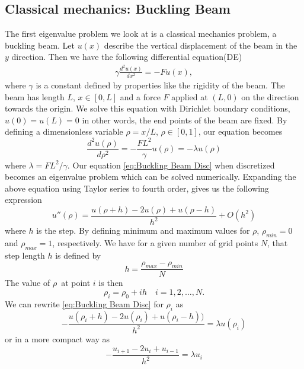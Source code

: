 \documentclass[%
reprint,
nofootinbib,
amsmath,amssymb,
aps,
]{revtex4-1}
\begin{document}
\subsection{Classical mechanics: Buckling Beam} %
The first eigenvalue problem we look at is a classical mechanics problem, a buckling beam. Let $u(x)$ describe the vertical displacement of the beam in the $y$ direction. Then we have the following differential equation(DE) 
\begin{eqnarray}
	\gamma\frac{d^2 u(x)}{dx^2} = -Fu(x),
\end{eqnarray}
where $\gamma$ is a constant defined by properties like the rigidity of the beam. The beam has length $L$, $x\in [0,L]$ and a force $F$ applied at $(L,0)$ on the direction towards the origin. 
We solve this equation with Dirichlet boundary conditions, $u(0) = u(L) = 0$ in other words, the end points of the beam are fixed. 
By defining a dimensionless variable $\rho = x/L$, $\rho \in [0,1]$, our equation becomes 
\begin{equation}
	\frac{d^2u(\rho)}{d\rho^2} = -\frac{FL^2}{\gamma}u(\rho) = -\lambda u(\rho)\label{eq:Buckling Beam Disc}
\end{equation}
where $\lambda = FL^2/\gamma$. Our equation \ref{eq:Buckling Beam Disc} when discretized becomes an eigenvalue problem which can be solved numerically. Expanding the above equation using Taylor series to fourth order, gives us the following expression 
\begin{equation}\label{ddu}
	u''(\rho) = \frac{u(\rho + h)- 2u(\rho) + u(\rho- h)}{h^2} + O(h^2)
\end{equation}
where $h$ is the step. By defining minimum and maximum values for $\rho$, $\rho_{min} = 0$ and $\rho_{max} = 1$, respectively. We have for a given number of grid points $N$, that step length $h$ is defined by
\begin{equation}
	h = \frac{\rho_{max} - \rho_{min}}{N}
\end{equation}
The value of $\rho$ at point $i$ is then 
\begin{equation}
	\rho_i = \rho_0 + ih \quad i = 1,2,\dots , N.
\end{equation}
We can rewrite \ref{eq:Buckling Beam Disc} for $\rho_i$ as 
\begin{equation}\label{BB_disc}
-	\frac{u(\rho_i + h) - 2u(\rho_i) + u(\rho_i - h))}{h^2} = \lambda u(\rho_i)
\end{equation}
or in a more compact way as 
\begin{equation}
	-\frac{u_{i+1} - 2u_i + u_{i-1}}{h^2} = \lambda u_i
\end{equation}
\end{document}
